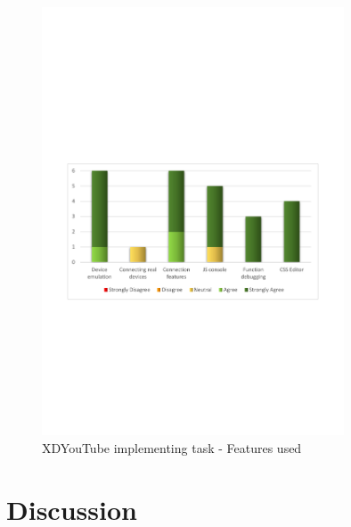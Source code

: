 \begin{figure}[H]
  \centering
    \includegraphics[width=0.8\textwidth]{images/charts/xdyt_impl_features_used.pdf}
	\caption[xdyt-impl: Features used]{XDYouTube implementing task - Features used}
	\label{fig:xdyt_impl_features_used}
\end{figure}

\section{Discussion}

